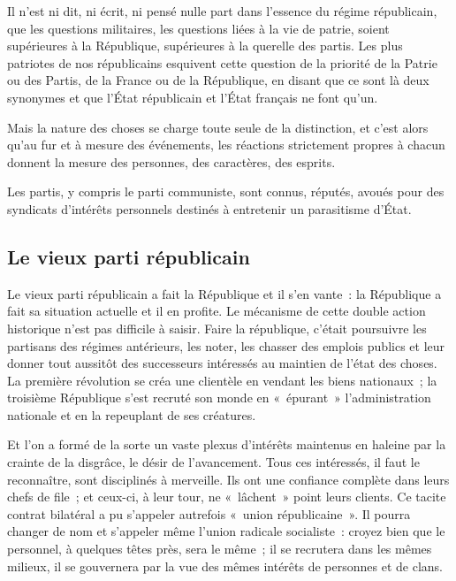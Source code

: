 \documentclass[french,twoside]{book} %
\newcommand{\astermono}{\medskip\centerline{\color{rubric}\large\selectfont{\syms ✻}}\medskip\par}%
\begin{document}
\noindent Il n’est ni dit, ni écrit, ni pensé nulle part dans l’essence du régime républicain, que les questions militaires, les questions liées à la vie de patrie, soient supérieures à la République, supérieures à la querelle des partis. Les plus patriotes de nos républicains esquivent cette question de la priorité de la Patrie ou des Partis, de la France ou de la République, en disant que ce sont là deux synonymes et que l’État républicain et l’État français ne font qu’un.\par
Mais la nature des choses se charge toute seule de la distinction, et c’est alors qu’au fur et à mesure des événements, les réactions strictement propres à chacun donnent la mesure des personnes, des caractères, des esprits.\par

\astermono

\noindent Les partis, y compris le parti communiste, sont connus, réputés, avoués pour des syndicats d’intérêts personnels destinés à entretenir un parasitisme d’État.
\subsection[Le vieux parti républicain]{Le vieux parti républicain}
\noindent Le vieux parti républicain a fait la République et il s’en vante : la République a fait sa situation actuelle et il en profite. Le mécanisme de cette double action historique n’est pas difficile à saisir. Faire la république, c’était poursuivre les partisans des régimes antérieurs, les noter, les chasser des emplois publics et leur donner tout aussitôt des successeurs intéressés au maintien de l’état des choses. La première révolution se créa une clientèle en vendant les biens nationaux ; la troisième République s’est recruté son monde en « épurant » l’administration nationale et en la repeuplant de ses créatures.\par
Et l’on a formé de la sorte un vaste plexus d’intérêts maintenus en haleine par la crainte de la disgrâce, le désir de l’avancement. Tous ces intéressés, il faut le reconnaître, sont disciplinés à merveille. Ils ont une confiance complète dans leurs chefs de file ; et ceux-ci, à leur tour, ne « lâchent » point leurs clients. Ce tacite contrat bilatéral a pu s’appeler autrefois « union républicaine ». Il pourra changer de nom et s’appeler même l’union radicale socialiste : croyez bien que le personnel, à quelques têtes près, sera le même ; il se recrutera dans les mêmes milieux, il se gouvernera par la vue des mêmes intérêts de personnes et de clans.\par
\end{document}
